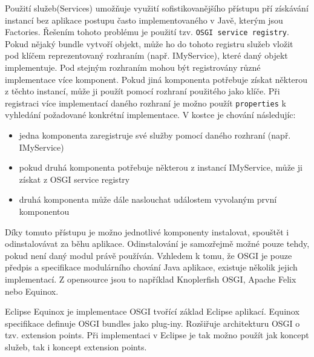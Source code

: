 \documentclass[ing,male,java,dept460]{diploma}		%
\begin{document}
\par Použití služeb(Services) umožňuje využití sofistikovanějšího přístupu pří získávání instancí bez aplikace postupu často implementovaného v Javě, kterým jsou Factories. Řešením tohoto problému je použití tzv. \texttt{OSGI service registry}. Pokud nějaký bundle vytvoří objekt, může ho do tohoto registru služeb vložit pod klíčem reprezentovaný rozhraním (např. IMyService), které daný objekt implementuje. Pod stejným rozhraním mohou být registrovány různé implementace více komponent. Pokud jiná komponenta potřebuje získat některou z těchto instancí, může ji použít pomocí rozhraní použitého jako klíče. Při registraci více implementací daného rozhraní je možno použít \texttt{properties} k vyhledání požadované konkrétní implementace. V kostce je chování následujíc\cite{osgiArchitecture}:
\begin{itemize}
	\item jedna komponenta zaregistruje své služby pomocí daného rozhraní (např. IMyService)
	\item pokud druhá komponenta potřebuje některou z instancí IMyService, může ji získat z OSGI service registry
	\item druhá komponenta může dále naslouchat událostem vyvolaným první komponentou
\end{itemize}
\par Díky tomuto přístupu je možno jednotlivé komponenty instalovat, spouštět i odinstalovávat za běhu aplikace. Odinstalování je samozřejmě možné pouze tehdy, pokud není daný modul právě používán. Vzhledem k tomu, že OSGI je pouze předpis a specifikace modulárního chování Java aplikace, existuje několik jejich implementací. Z opensource jsou to například Knoplerfish OSGI, Apache Felix nebo Equinox.
\par Eclipse Equinox je implementace OSGI tvořící základ Eclipse aplikací. Equinox specifikace definuje OSGI bundles jako plug-iny. Rozšiřuje architekturu OSGI o tzv. extension points. Při implementaci v Eclipse je tak možno použít jak koncept služeb, tak i koncept extension points\cite{vogellaOsgi}.
\end{document}
